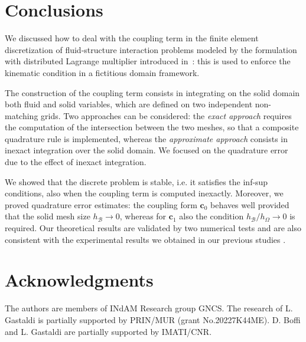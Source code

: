 \documentclass[oneside]{amsart} %
\newcommand\B{\mathcal B} %
\renewcommand\c{\mathbf{c}} %
\begin{document}
	\section{Conclusions}
	
	We discussed how to deal with the coupling term in the finite element discretization of fluid-structure interaction problems modeled by the formulation with distributed Lagrange multiplier introduced in~\cite{2015}: this is used to enforce the kinematic condition in a fictitious domain framework.
	
	The construction of the coupling term consists in integrating on the solid domain both fluid and solid variables, which are defined on two independent non-matching grids. Two approaches can be considered: the \textit{exact approach} requires the computation of the intersection between the two meshes, so that a composite quadrature rule is implemented, whereas the \textit{approximate approach} consists in inexact integration over the solid domain. We focused on the quadrature error due to the effect of inexact integration.
	
	We showed that the discrete problem is stable, i.e. it satisfies the
	inf-sup conditions, also when the coupling term is computed inexactly.
	Moreover, we proved quadrature error estimates: the coupling form $\c_0$
	behaves well provided that the solid mesh size $h_\B\rightarrow0$, whereas for $\c_1$ also the condition $h_\B/h_\Omega\rightarrow0$ is required. Our theoretical results are validated by two numerical tests and are also consistent with the experimental results we obtained in our previous studies \cite{boffi2022interface,boffi2022parallel}.
	
	\section*{Acknowledgments}
	The authors are members of INdAM Research group GNCS. The research of L. Gastaldi is partially supported by PRIN/MUR (grant No.20227K44ME). D. Boffi and L. Gastaldi are partially supported by IMATI/CNR.
	

	
	
\end{document}
